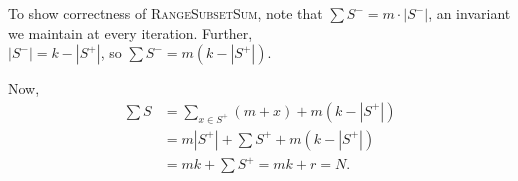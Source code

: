 \documentclass[11pt, reqno, psamsfonts]{amsart}
\theoremstyle{plain}
\theoremstyle{definition}
\theoremstyle{remark}
\begin{document}
To show correctness of \textsc{RangeSubsetSum}, note that $\sum S^- = m \cdot |S^-|$, an invariant we maintain at every iteration. Further,\\
$|S^-| = k - |S^+|$, so $\sum S^- = m(k - |S^+|)$.

Now,
\begin{align*}
\sum S &= \sum_{x \in S^+} (m+x) + m(k - |S^+|)\\
&= m|S^+| + \sum S^+ + m(k - |S^+|)\\
&= mk + \sum S^+ = mk + r = N.
\end{align*}
\newpage



\end{document}
